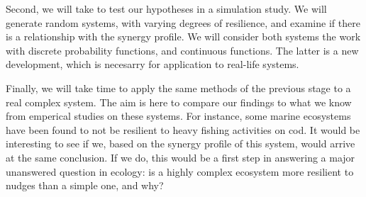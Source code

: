 \documentclass[11pt]{article}
\begin{document}
Second, we will take to test our hypotheses in a simulation study. 
We will generate random systems, with varying degrees of resilience, and examine if there is a relationship with the synergy profile. 
We will consider both systems the work with discrete probability functions, and continuous functions. 
The latter is a new development, which is necesarry for application to real-life systems.

Finally, we will take time to apply the same methods of the previous stage to a real complex system. 
The aim is here to compare our findings to what we know from emperical studies on these systems. 
For instance, some marine ecosystems have been found to not be resilient to heavy fishing activities on cod.
It would be interesting to see if we, based on the synergy profile of this system, would arrive at the same conclusion.
If we do, this would be a first step in answering a major unanswered question in ecology: is a highly complex ecosystem more resilient to nudges than a simple one, and why?
\end{document}
